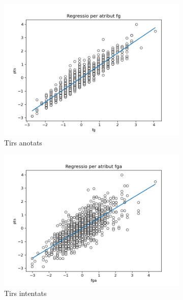 \documentclass{article}
\begin{document}
\begin{figure}[!h]
	\centering
	\begin{subfigure}[b]{0.25\textwidth}
		\centering
		\includegraphics[width=\textwidth]{reg7}
		\caption*{Tirs anotats}
		\label{fig:reg7}
	\end{subfigure}
	\hfill
	\begin{subfigure}[b]{0.25\textwidth}
		\centering
		\includegraphics[width=\textwidth]{reg8}
		\caption*{Tirs intentats}
		\label{fig:hist23}
	\end{subfigure}
	\hfill
	\begin{subfigure}[b]{0.25\textwidth}
		\centering

\end{subfigure}
\end{figure}
\end{document}
